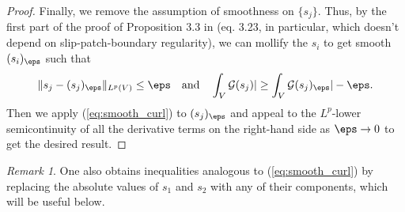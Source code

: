 \documentclass[11pt,reqno]{amsart}
\theoremstyle{plain}
\theoremstyle{definition}
\theoremstyle{remark}
\newtheorem{remark}{Remark}
\begin{document}
\begin{proof}
Finally, we remove the assumption of smoothness on $\{s_j\}$. Thus, by the first part of the proof of Proposition 3.3 in \cite{ang2} (eq. 3.23, in particular, which doesn't depend on slip-patch-boundary regularity), we can mollify the $s_i$ to get
smooth $(s_i)_{\eps}$ such that
\begin{equation} \label{eq:approx}
\|s_j - (s_j)_{\eps}\|_{L^p(V)}\leq\eps \quad \mathrm{and} \quad \int_V\mathcal{G}(s_j)|\geq \int_V\mathcal{G}(s_j)_{\eps}| -\eps.
\end{equation}
Then we apply (\ref{eq:smooth_curl}) to $(s_j)_{\eps}$ and appeal to the $L^p$-lower semicontinuity of all the derivative terms on the right-hand side as $\eps\rightarrow 0$ to get the desired result.
\end{proof}

\begin{remark}\label{rem:comp}
One also obtains inequalities analogous to (\ref{eq:smooth_curl}) by replacing the absolute values of $s_1$ and $s_2$ with any of their components, which will be useful below.
\end{remark}
\end{document}
